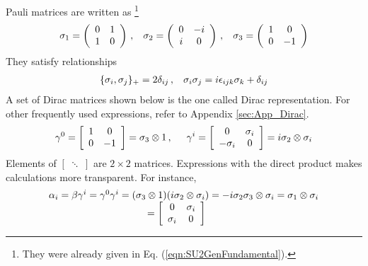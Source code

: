 Pauli matrices are written as
\footnote{
They were already given in Eq. (\ref{eqn:SU2GenFundamental}).
}
\begin{eqnarray}
\sigma_1 =
\left(
\begin{array}{cc}
0 & 1 \\ 1 & 0
\end{array}
\right)\,,
\hspace{3mm}
\sigma_2 =
\left(
\begin{array}{cc}
0 & -i \\ i & 0
\end{array}
\right)\,,
\hspace{3mm}
\sigma_3 =
\left(
\begin{array}{cc}
1 &  0\\ 0 & -1
\end{array}
\right)
\end{eqnarray}
They satisfy relationships
\begin{eqnarray}
\{
\sigma_i, \sigma_j \}_+ = 2 \delta_{ij}\,,
\hspace{3mm}
\sigma_i \sigma_j = i\epsilon_{ijk} \sigma_k + \delta_{ij}
\end{eqnarray}
A set of Dirac matrices shown below is the one called Dirac representation.
For other frequently used expressions, refer to Appendix \ref{sec:App_Dirac}.
\begin{eqnarray}
\gamma^0
=
\left[
\begin{array}{cc}
1 & 0 \\ 0 & -1
\end{array}
\right]
= \sigma_3 \otimes 1
\,,
\hspace{5mm}
\gamma^i
=
\left[
\begin{array}{cc}
0 & \sigma_i \\ -\sigma_i & 0
\end{array}
\right]
=
i\sigma_2 \otimes \sigma_i
\end{eqnarray}
Elements of $\left[\;\ddots\;\right]$ are $2 \times 2$ matrices.
Expressions with the direct product makes calculations more transparent. 
For instance,
\begin{eqnarray}
\begin{array}{l}
\alpha_i = \beta \gamma^i = \gamma^0 \gamma^i
= (\sigma_3 \otimes 1)(i\sigma_2 \otimes \sigma_i)
= -i \sigma_2 \sigma_3 \otimes \sigma_i
= \sigma_1 \otimes \sigma_i
\\
\hspace{35mm}
=
\left[
\begin{array}{cc}
0 & \sigma_i
\\
\sigma_i & 0
\end{array}
\right]
\end{array}
\end{eqnarray}
